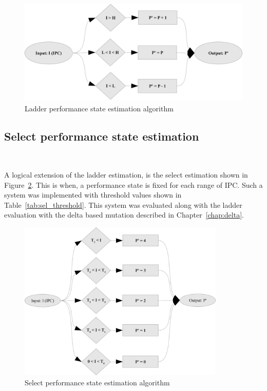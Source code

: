 \begin{figure}[h!]
  \begin{center}
    \includegraphics[height=2in]{figures/Ladder_Evaluation.jpg}%
    \caption{Ladder performance state estimation algorithm}
    \label{fig:ladder_method}
  \end{center}
\end{figure}

\subsection{Select performance state estimation}~\label{sec:select}

A logical extension of the ladder estimation, is the select estimation shown in Figure~\ref{fig:select_method}.
This is when, a performance state is fixed for each range of IPC. Such a system was implemented with 
threshold values shown in Table~\ref{tab:sel_threshold}. This system was evaluated along with
the ladder evaluation with the delta based mutation described in Chapter~\ref{chap:delta}.

\begin{figure}[h!]
  \begin{center}
    \includegraphics[height=3in]{figures/Select_Evaluation.jpg}%
    \caption{Select performance state estimation algorithm}
    \label{fig:select_method}
  \end{center}
\end{figure}

